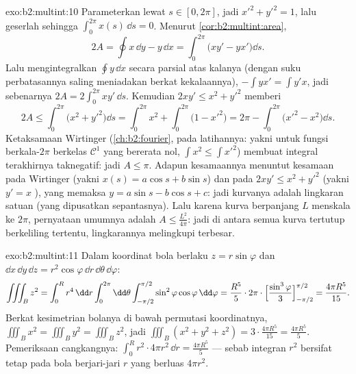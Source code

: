 \begin{solution}{exo:b2:multint:10}
Parameterkan lewat  $s \in [0, 2\pi]$, jadi $x'^2 + y'^2 = 1$,
lalu geserlah sehingga $\int_0^{2\pi} x(s)\,\dd s = 0$. Menurut
\cref{cor:b2:multint:area},
\[
2A = \oint x\,\dd y - y\,\dd x
= \int_0^{2\pi}\bigl(xy' - yx'\bigr)\dd s .
\]
Lalu mengintegralkan $\oint y\,\dd x$ secara parsial atas kalanya (dengan suku
perbatasannya saling meniadakan berkat kekalaannya), $-\int yx' = \int y'x$, jadi sebenarnya
$2A = 2\int_0^{2\pi}xy'\,\dd s$. Kemudian $2xy' \leq x^2 + y'^2$
memberi
\[
2A \leq \int_0^{2\pi}\bigl(x^2 + y'^2\bigr)\dd s
= \int_0^{2\pi} x^2 + \int_0^{2\pi}\bigl(1 - x'^2\bigr)
= 2\pi - \int_0^{2\pi}\bigl(x'^2 - x^2\bigr)\dd s .
\]
Ketaksamaan Wirtinger (\cref{ch:b2:fourier}, pada latihannya: yakni untuk
fungsi berkala-$2\pi$ berkelas $\mathcal{C}^1$ yang bererata nol,
$\int x^2 \leq \int x'^2$) membuat integral terakhirnya taknegatif:
jadi $A \leq \pi$. Adapun kesamaannya menuntut kesamaan pada Wirtinger (yakni $x(s) =
a\cos s + b\sin s$) dan pada $2xy' \leq x^2 + y'^2$ (yakni $y' = x$
), yang memaksa $y = a\sin s - b\cos s + c$: jadi kurvanya adalah
lingkaran satuan (yang dipusatkan sepantasnya). Lalu karena kurva berpanjang $L$
menskala ke  $2\pi$, pernyataan umumnya adalah $A \leq
\frac{L^2}{4\pi}$: jadi di antara semua kurva tertutup berkeliling tertentu,
lingkarannya melingkupi  terbesar.
\end{solution}

\begin{solution}{exo:b2:multint:11}
Dalam koordinat bola berlaku $z = r\sin\varphi$ dan $\dd x\,\dd
y\,\dd z = r^2\cos\varphi\,\dd r\,\dd\theta\,\dd\varphi$:
\[
\iiint_B z^2
= \int_0^R r^4\,\dd r\int_0^{2\pi}\dd\theta
\int_{-\pi/2}^{\pi/2}\sin^2\varphi\cos\varphi\,\dd\varphi
= \frac{R^5}5\cdot2\pi\cdot
\Bigl[\frac{\sin^3\varphi}3\Bigr]_{-\pi/2}^{\pi/2}
= \frac{4\pi R^5}{15}.
\]
Berkat kesimetrian bolanya di bawah permutasi koordinatnya,
$\iiint_B x^2 = \iiint_B y^2 = \iiint_B z^2$, jadi $\iiint_B(x^2
+ y^2 + z^2) = 3\cdot\frac{4\pi R^5}{15} = \frac{4\pi R^5}5$.
Pemeriksaan cangkangnya: $\int_0^R r^2\cdot 4\pi r^2\,\dd r = \frac{4\pi
R^5}5$ --- sebab integran $r^2$ bersifat tetap pada bola berjari-jari
$r$ yang berluas $4\pi r^2$.
\end{solution}

